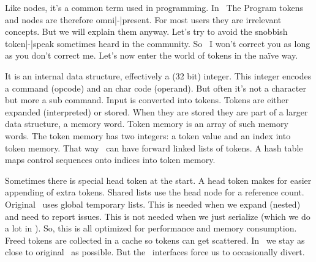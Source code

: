 

\startdocument
  [title={TOKENS},
   banner={tokens as I see them},
   location={context\enspace {\bf 2020}\enspace meeting}]

\starttitle[title=About tokens]

\startitemize

\startitem Like nodes, it's a common term used in programming. \stopitem
\startitem In \TEX\ The Program tokens and nodes are therefore omni|-|present. \stopitem
\startitem For most users they are irrelevant concepts. \stopitem
\startitem But we will explain them anyway. \stopitem
\startitem Let's try to avoid the snobbish token|-|speak sometimes heard in the community. \stopitem
\startitem So \unknown\ I won't correct you as long as you don't correct me. \stopitem
\startitem Let's now enter the world of tokens in the na\"ive way. \stopitem

\stopitemize

\stoptitle

\starttitle[title=What are tokens]

\startitemize

\startitem It is an internal data structure, effectively a (32 bit) integer. \stopitem
\startitem This integer encodes a command (opcode) and an char code (operand). \stopitem
\startitem But often it's not a character but more a sub command. \stopitem
\startitem Input is converted into tokens. \stopitem
\startitem Tokens are either expanded (interpreted) or stored. \stopitem
\startitem When they are stored they are part of a larger data structure, a memory word. \stopitem
\startitem Token memory is an array of such memory words. \stopitem
\startitem The token memory  has two integers: a token value and an index into token memory. \stopitem
\startitem That way \TEX\ can have forward linked lists of tokens. \stopitem
\startitem A hash table maps control sequences onto indices into token memory. \stopitem

\stopitemize

\stoptitle

\starttitle[title=Some implementation details]

\startitemize

\startitem Sometimes there is special head token at the start. \stopitem
\startitem A head token makes for easier appending of extra tokens. \stopitem
\startitem Shared lists use the head node for a reference count. \stopitem
\startitem Original \TEX\ uses global temporary lists. \stopitem
\startitem This is needed when we expand (nested) and need to report issues. \stopitem
\startitem This is not needed when we just serialize (which we do a lot in \LUATEX). \stopitem
\startitem So, this is all optimized for performance and memory consumption. \stopitem
\startitem Freed tokens are collected in a cache so tokens can get scattered. \stopitem
\startitem In \LUAMETATEX\ we stay as close to original \TEX\ as possible. \stopitem
\startitem But the \LUA\ interfaces force us to occasionally divert. \stopitem

